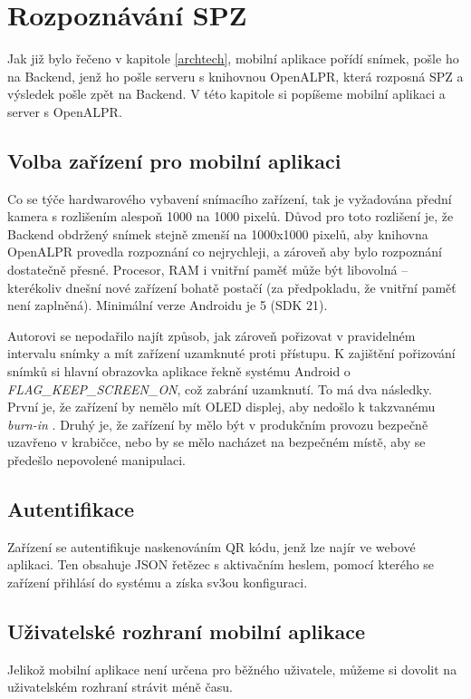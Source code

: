 
\chapter{Rozpoznávání SPZ}

Jak již bylo řečeno v kapitole \ref{archtech}, mobilní aplikace pořídí snímek,
pošle ho na Backend, jenž ho pošle serveru s knihovnou OpenALPR, která
rozposná SPZ a výsledek pošle zpět na Backend. V této kapitole si popíšeme
mobilní aplikaci a server s OpenALPR.

\section{Volba zařízení pro mobilní aplikaci}

Co se týče hardwarového vybavení snímacího zařízení, tak je vyžadována přední kamera
s rozlišením alespoň 1000 na 1000 pixelů. Důvod pro toto rozlišení je, že Backend obdržený snímek
stejně zmenší na 1000x1000 pixelů, aby knihovna OpenALPR provedla rozpoznání co nejrychleji, a zároveň
aby bylo rozpoznání dostatečně přesné. Procesor, RAM i vnitřní paměť může být libovolná -- kterékoliv
dnešní nové zařízení bohatě postačí (za předpokladu, že vnitřní paměť není zaplněná).
Minimální verze Androidu je 5 (SDK 21).

Autorovi se nepodařilo najít způsob, jak zároveň pořizovat v pravidelném intervalu snímky
a mít zařízení uzamknuté proti přístupu. K zajištění pořizování snímků si hlavní
obrazovka aplikace řekně systému Android o \textit{FLAG\_KEEP\_SCREEN\_ON}, což zabrání uzamknutí.
To má dva následky. První je, že zařízení by nemělo mít OLED displej, aby nedošlo k takzvanému
\textit{burn-in} \citep[viz][]{OledBurnIn}. Druhý je, že zařízení by mělo být v produkčním provozu
bezpečně uzavřeno v krabičce, nebo by se mělo nacházet na bezpečném místě, aby se předešlo
nepovolené manipulaci.

\section{Autentifikace}

Zařízení se autentifikuje naskenováním QR kódu, jenž lze najír ve webové aplikaci. Ten obsahuje
JSON řetězec s aktivačním heslem, pomocí kterého se zařízení přihlásí do systému a získa sv3ou konfiguraci.

\section{Uživatelské rozhraní mobilní aplikace}

Jelikož mobilní aplikace není určena pro běžného uživatele, můžeme si dovolit
na uživatelském rozhraní strávit méně času.

\section{}

